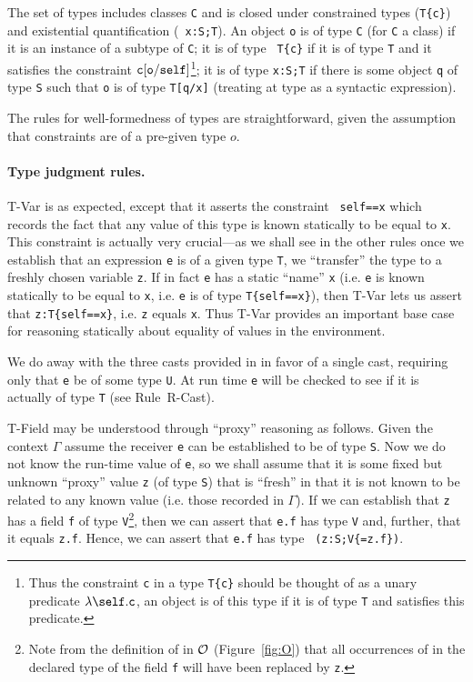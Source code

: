 The set of types includes classes {\tt C} and is closed under
constrained types ({\tt T\{c\}}) and existential quantification ({\tt
x:S;T}). An object {\tt o} is of type {\tt C} (for {\tt C} a class)
if it is an instance of a subtype of {\tt C}; it is of type {\tt
T\{c\}} if it is of type {\tt T} and it satisfies the constraint $\tt
c[o/self]$\footnote{Thus the constraint {\tt c} in a type {\tt T\{c\}}
should be thought of as a unary predicate $\lambda\self.{\tt c}$, an
object is of this type if it is of type {\tt T} and satisfies this
predicate.}; it is of type {\tt x:S;T} if there is some object {\tt q}
of type {\tt S} such that {\tt o} is of type {\tt T[q/x]} (treating at
type as a syntactic expression).

The rules for well-formedness of types are straightforward, given 
the assumption that constraints are of a pre-given type $o$.

\paragraph{Type judgment rules.}
{\sc T-Var} is as expected, except that it asserts the constraint {\tt
self==x} which records the fact that any value of this type is known
statically to be equal to {\tt x}. This constraint is actually very
crucial---as we shall see in the other rules once we establish that
an expression {\tt e} is of a given type {\tt T}, we ``transfer'' the
type to a freshly chosen variable {\tt z}. If in fact {\tt e} has a
static ``name'' {\tt x} (i.e.{} {\tt e} is known statically to be
equal to {\tt x}, i.e.{} {\tt e} is of type {\tt T\{self==x\}}), then
{\sc T-Var} lets us assert that {\tt z:T\{self==x\}}, i.e.{} {\tt z}
equals {\tt x}. Thus {\sc T-Var} provides an important base case for
reasoning statically about equality of values in the environment.

We do away with the three casts provided in\FJ{} in favor of a single
cast, requiring only that {\tt e} be of some type {\tt U}. At run time
{\tt e} will be checked to see if it is actually of type {\tt T} (see
Rule~{\sc R-Cast}).

{\sc T-Field} may be understood through ``proxy'' reasoning as
follows.  Given the context $\Gamma$ assume the receiver {\tt e} can
be established to be of type {\tt S}. Now we do not know the run-time
value of {\tt e}, so we shall assume that it is some fixed but unknown
``proxy'' value {\tt z} (of type {\tt S}) that is ``fresh'' in that it
is not known to be related to any known value (i.e.{} those recorded
in $\Gamma$).  If we can establish that {\tt z} has a field {\tt f} of
type {\tt V}\footnote{Note from the definition of
\fields{} in ${\cal O}$ (Figure~\ref{fig:O}) that all occurrences of
\this{} in the declared type of the field {\tt f} will have been replaced
by {\tt z}.}, then we can assert that
{\tt e.f} has type {\tt V} and, further, that it equals {\tt z.f}.
Hence, we can assert that {\tt e.f} has type {\tt
(z:S;V\{\self=z.f\})}.

